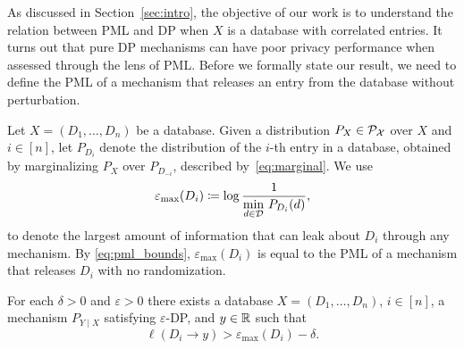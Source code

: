 As discussed in Section~\ref{sec:intro}, the objective of our work is to understand the relation between PML and DP when $X$ is a database with correlated entries. It turns out that pure DP mechanisms can have poor privacy performance when assessed through the lens of PML. Before we formally state our result, we need to define the PML of a mechanism that releases an entry from the database without perturbation. 

Let $X = (D_1, \ldots, D_n)$ be a database. Given a distribution $P_X \in \mathcal{P}_{\mathcal{X}}$ over $X$ and $i \in [n]$, let $P_{D_i}$ denote the distribution of the $i$-th entry in a database, obtained by marginalizing $P_X$ over $P_{D_{-i}}$, described by~\eqref{eq:marginal}. We use
\begin{equation*}
    \varepsilon_\mathrm{max} (D_i) \coloneqq \log \frac{1}{\min\limits_{d \in \mathcal{D}} \, P_{D_i}(d)},
\end{equation*}
 to denote the largest amount of information that can leak about $D_i$ through any mechanism. By \eqref{eq:pml_bounds}, $\varepsilon_\mathrm{max} (D_i)$ is equal to the PML of a mechanism that releases $D_i$ with no randomization.  

\begin{theorem}
\label{thm:main}
For each $\delta >0$ and $\varepsilon >0$ there exists a database $X = (D_1, \ldots, D_n)$, $i \in [n]$, a mechanism $P_{Y \mid X}$ satisfying $\varepsilon$-DP, and $y \in \mathbb{R}$ such that
\begin{equation*}
    \ell(D_i \to y) > \varepsilon_\mathrm{max}(D_i) - \delta.
\end{equation*}
\end{theorem}

